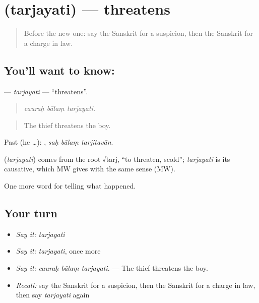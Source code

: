 \section[\texorpdfstring{\sk{तर्जयति} (tarjayati)}{तर्जयति (tarjayati)}]{ (tarjayati) — threatens}

\label{lesson:SA-C288-tarjayati}



\begin{quote}
Before the new one: say the Sanskrit for a suspicion, then the Sanskrit for a charge in law.
\end{quote}

\subsection*{You'll want to know: }
\textbf{} — \emph{tarjayati} — \textquotedblleft{}threatens\textquotedblright{}.

\begin{quote}
  
\end{quote}

\begin{quote}
\emph{cauraḥ bālaṃ tarjayati.}
\end{quote}

\begin{quote}
The thief threatens the boy.
\end{quote}

Past (he …):   , \emph{saḥ bālaṃ tarjitavān}.

\begin{cousinweb}
\textbf{} (\emph{tarjayati}) comes from the root √tarj, \textquotedblleft{}to threaten, scold\textquotedblright{}; \emph{tarjayati} is its causative, which MW gives with the same sense (MW).
\end{cousinweb}

\begin{grammarlens}[title={What you've built}]
One more word for telling what happened.
\end{grammarlens}

\subsection*{Your turn}
\begin{itemize}
\raggedright
  \item \emph{Say it:} \emph{tarjayati}
  \item \emph{Say it:} \emph{tarjayati}, once more
  \item \emph{Say it:} \emph{cauraḥ bālaṃ tarjayati.} — The thief threatens the boy.
  \item \emph{Recall:} say the Sanskrit for a suspicion, then the Sanskrit for a charge in law, then say \emph{tarjayati} again
\end{itemize}

